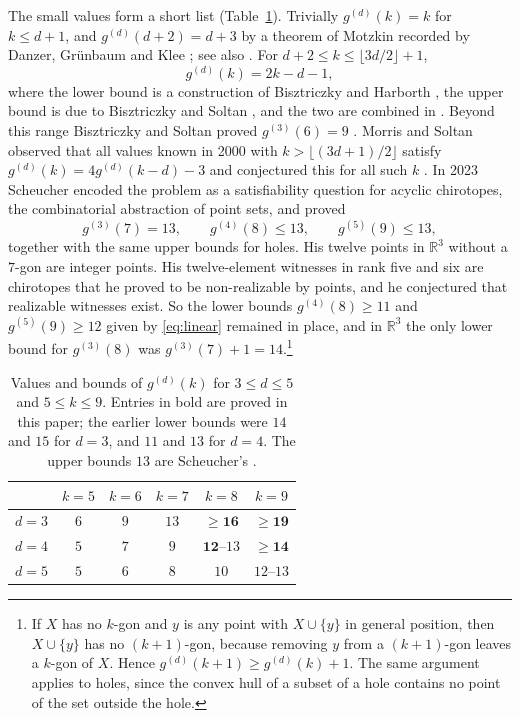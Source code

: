 \documentclass[aps,prd,twocolumn,superscriptaddress,nofootinbib,longbibliography,floatfix,showkeys,amsmath,amssymb,10pt]{revtex4-2}
\theoremstyle{plain}
\theoremstyle{definition}
\theoremstyle{plain}
\newcommand{\R}{\mathbb{R}}
\begin{document}
The small values form a short list (Table~\ref{tab:known}). Trivially $g^{(d)}(k)=k$ for $k\le d+1$, and $g^{(d)}(d+2)=d+3$ by a theorem of Motzkin recorded by Danzer, Gr\"unbaum and Klee \cite{DGK63}; see also \cite{Gru03}. For $d+2\le k\le\lfloor 3d/2\rfloor+1$,
\begin{equation}\label{eq:linear}
g^{(d)}(k)=2k-d-1,
\end{equation}
where the lower bound is a construction of Bisztriczky and Harborth \cite{BH95}, the upper bound is due to Bisztriczky and Soltan \cite{BS94}, and the two are combined in \cite[Theorem~4.1]{MS00}. Beyond this range Bisztriczky and Soltan proved $g^{(3)}(6)=9$ \cite{BS94}. Morris and Soltan observed that all values known in 2000 with $k>\lfloor(3d+1)/2\rfloor$ satisfy $g^{(d)}(k)=4g^{(d)}(k-d)-3$ and conjectured this for all such $k$ \cite[Conjecture~4.2]{MS00}. In 2023 Scheucher \cite{Sch23} encoded the problem as a satisfiability question for acyclic chirotopes, the combinatorial abstraction of point sets, and proved
\begin{equation}\label{eq:scheucher}
g^{(3)}(7)=13,\qquad g^{(4)}(8)\le13,\qquad g^{(5)}(9)\le13,
\end{equation}
together with the same upper bounds for holes. His twelve points in $\R^3$ without a $7$-gon are integer points. His twelve-element witnesses in rank five and six are chirotopes that he proved to be non-realizable by points, and he conjectured that realizable witnesses exist. So the lower bounds $g^{(4)}(8)\ge11$ and $g^{(5)}(9)\ge12$ given by \eqref{eq:linear} remained in place, and in $\R^3$ the only lower bound for $g^{(3)}(8)$ was $g^{(3)}(7)+1=14$.\footnote{If $X$ has no $k$-gon and $y$ is any point with $X\cup\{y\}$ in general position, then $X\cup\{y\}$ has no $(k+1)$-gon, because removing $y$ from a $(k+1)$-gon leaves a $k$-gon of $X$. Hence $g^{(d)}(k+1)\ge g^{(d)}(k)+1$. The same argument applies to holes, since the convex hull of a subset of a hole contains no point of the set outside the hole.}

\begin{table}[tb]
\caption{Values and bounds of $g^{(d)}(k)$ for $3\le d\le5$ and $5\le k\le9$. Entries in bold are proved in this paper; the earlier lower bounds were $14$ and $15$ for $d=3$, and $11$ and $13$ for $d=4$. The upper bounds $13$ are Scheucher's \cite{Sch23}.}\label{tab:known}
\begin{ruledtabular}
\begin{tabular}{cccccc}
 & $k=5$ & $k=6$ & $k=7$ & $k=8$ & $k=9$\\ \hline
$d=3$ & $6$ & $9$ & $13$ & $\ge\mathbf{16}$ & $\ge\mathbf{19}$\\
$d=4$ & $5$ & $7$ & $9$ & $\mathbf{12}$--$13$ & $\ge\mathbf{14}$\\
$d=5$ & $5$ & $6$ & $8$ & $10$ & $12$--$13$\\
\end{tabular}
\end{ruledtabular}
\end{table}
\end{document}
